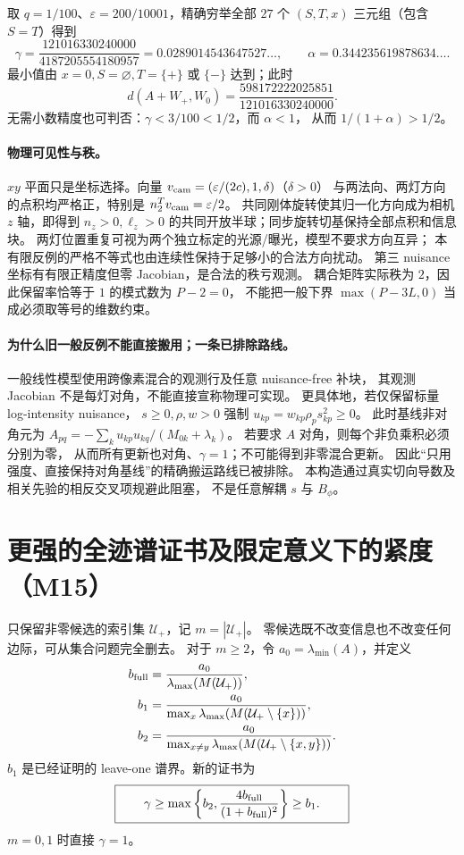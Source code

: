 取 $q=1/100$、$\varepsilon=200/10001$，精确穷举全部 $27$ 个
$(S,T,x)$ 三元组（包含 $S=T$）得到
\[
 \gamma=\frac{121016330240000}{4187205554180957}
 =0.0289014543647527\ldots,
 \qquad \alpha=0.344235619878634\ldots .
\]
最小值由 $x=0,S=\varnothing,T=\{+\}$ 或 $\{-\}$ 达到；此时
\[
 d(A+W_+,W_0)=\frac{598172222025851}{121016330240000}.
\]
无需小数精度也可判否：$\gamma<3/100<1/2$，而 $\alpha<1$，
从而 $1/(1+\alpha)>1/2$。

\paragraph{物理可见性与秩。}
$xy$ 平面只是坐标选择。向量
$v_{\rm cam}=(\varepsilon/(2c),1,\delta)$（$\delta>0$）
与两法向、两灯方向的点积均严格正，特别是
$n_2^Tv_{\rm cam}=\varepsilon/2$。
共同刚体旋转使其归一化方向成为相机 $z$ 轴，即得到
$n_z>0,\ell_z>0$ 的共同开放半球；同步旋转切基保持全部点积和信息块。
两灯位置重复可视为两个独立标定的光源/曝光，模型不要求方向互异；
本有限反例的严格不等式也由连续性保持于足够小的合法方向扰动。
第三 nuisance 坐标有有限正精度但零 Jacobian，是合法的秩亏观测。
耦合矩阵实际秩为 $2$，因此保留率恰等于 $1$ 的模式数为 $P-2=0$，
不能把一般下界 $\max(P-3L,0)$ 当成必须取等号的维数约束。

\paragraph{为什么旧一般反例不能直接搬用；一条已排除路线。}
一般线性模型使用跨像素混合的观测行及任意 nuisance-free 补块，
其观测 Jacobian 不是每灯对角，不能直接宣称物理可实现。
更具体地，若仅保留标量 log-intensity nuisance，
$s\ge0,\rho,w>0$ 强制 $u_{kp}=w_{kp}\rho_ps_{kp}^2\ge0$。
此时基线非对角元为
$A_{pq}=-\sum_k u_{kp}u_{kq}/(M_{0k}+\lambda_k)$。
若要求 $A$ 对角，则每个非负乘积必须分别为零，
从而所有更新也对角、$\gamma=1$；不可能得到非零混合更新。
因此“只用强度、直接保持对角基线”的精确搬运路线已被排除。
本构造通过真实切向导数及相关先验的相反交叉项规避此阻塞，
不是任意解耦 $s$ 与 $B_\phi$。

\section{更强的全迹谱证书及限定意义下的紧度（M15）}
\label{sec:gamma-tightness-extension}

只保留非零候选的索引集 $\mathcal U_+$，记 $m=|\mathcal U_+|$。
零候选既不改变信息也不改变任何边际，可从集合问题完全删去。
对于 $m\ge2$，令 $a_0=\lambda_{\min}(A)$，并定义
\begin{align}
 b_{\rm full}&=\frac{a_0}{\lambda_{\max}(M(\mathcal U_+))},\\
 b_1&=\frac{a_0}{\max_x\lambda_{\max}(M(\mathcal U_+\setminus\{x\}))},\\
 b_2&=\frac{a_0}{\max_{x\ne y}\lambda_{\max}(M(\mathcal U_+\setminus\{x,y\}))}.
\end{align}
$b_1$ 是已经证明的 leave-one 谱界。新的证书为
\begin{equation}
 \boxed{\qquad \gamma\ge
 \max\left\{b_2,\frac{4b_{\rm full}}{(1+b_{\rm full})^2}\right\}
 \ge b_1.\qquad}
 \label{eq:gamma-extension-combined}
\end{equation}
$m=0,1$ 时直接 $\gamma=1$。

